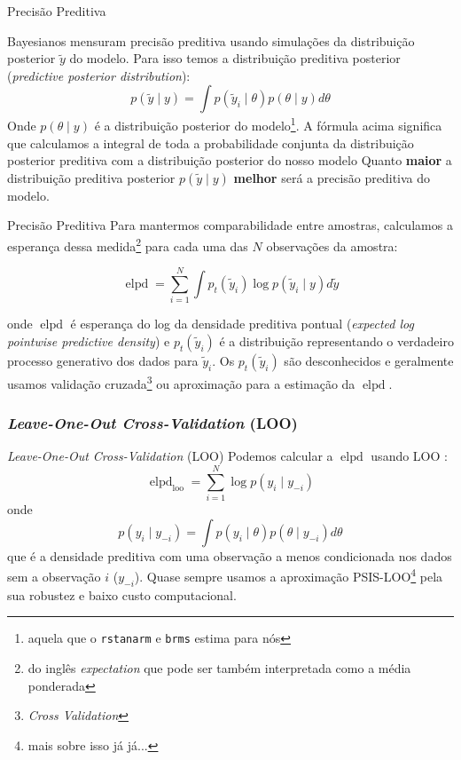 \begin{frame}{Precisão Preditiva}
    \begin{defn}
        Bayesianos mensuram precisão preditiva usando simulações da distribuição posterior
        $\tilde{y}$ do modelo. Para isso temos a distribuição preditiva posterior
        (\textit{predictive posterior distribution}):
        $$
        p(\tilde{y} \mid y) = \int p(\tilde{y}_i \mid \theta) p(\theta \mid y) d \theta
        $$
        \small
        Onde $p(\theta \mid y)$ é a distribuição posterior do modelo\footnote{aquela
        que o \texttt{rstanarm} e \texttt{brms} estima para nós}.
        A fórmula acima significa que calculamos a integral de toda a
        probabilidade conjunta da distribuição posterior preditiva com a
        distribuição posterior do nosso modelo
        \normalsize
        Quanto \textbf{maior} a distribuição preditiva posterior
        $p(\tilde{y} \mid y)$ \textbf{melhor} será a precisão preditiva do modelo.
    \end{defn}
\end{frame}

\begin{frame}{Precisão Preditiva}
    Para mantermos comparabilidade entre amostras, calculamos a
    esperança dessa medida\footnote{do inglês \textit{expectation} que pode ser
    também interpretada como a média ponderada} para cada uma das $N$ observações
    da amostra:

    $$
    \operatorname{elpd} = \sum_{i=1}^N \int p_t(\tilde{y}_i) \log p(\tilde{y}_i \mid y) d \tilde{y}
    $$

    onde $\operatorname{elpd}$ é esperança do log da densidade preditiva pontual
    (\textit{expected log pointwise predictive density}) e
    $p_t(\tilde{y}_i)$ é a distribuição representando o verdadeiro processo
    generativo dos dados para $\tilde{y}_i$.
    Os $p_t(\tilde{y}_i)$ são desconhecidos e geralmente usamos validação
    cruzada\footnote{\textit{Cross Validation}} ou aproximação para
    a estimação da $\operatorname{elpd}$.
\end{frame}

\subsubsection{\textit{Leave-One-Out Cross-Validation} (LOO)}
\begin{frame}{\textit{Leave-One-Out Cross-Validation} (LOO)}
    Podemos calcular a $\operatorname{elpd}$ usando LOO
    \parencite{vehtariPracticalBayesianModel2015}:
    $$
    \operatorname{elpd}_{\text{loo}} = \sum_{i=1}^N \log p(y_i \mid y_{-i})
    $$
    onde
    $$
    p(y_i \mid y_{-i}) = \int p(y_i \mid \theta) p(\theta \mid y_{-i}) d \theta
    $$
    que é a densidade preditiva com uma observação a menos condicionada nos
    dados sem a observação $i$ ($y_{-i}$). Quase sempre usamos a aproximação
    PSIS-LOO\footnote{mais sobre isso já já...} pela sua robustez e baixo custo
    computacional.
\end{frame}

